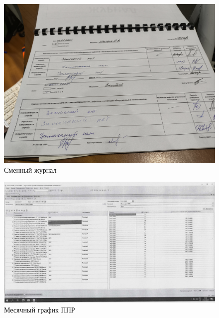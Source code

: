 \begin{figure}
\begin{center}
 \includegraphics[height=0.5\textheight, keepaspectratio]{Pics/VжурналнаГА2.jpg}
\end{center}
 \caption{Сменный журнал}
 \label{pic:VжурналнаГА2}
\end{figure}


\begin{figure}
\begin{center}
 \includegraphics[height=0.39\textheight, keepaspectratio]{Pics/XII.2..jpg}
\end{center}
 \caption{Месячный график ППР}
 \label{pic:XII.2..jpg}
\end{figure}

